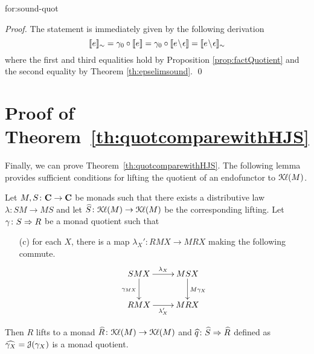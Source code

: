 \documentclass[oribibl,envcountsame,envcountsect,runningheads]{llncs}
\newcommand{\Kl}{\mathcal{K}{\kern-.2ex}\ell}
\newcommand{\lift}[1]{\smash{\widehat{#1}}}
\newcommand{\J}{\mathcal{J}}
\renewcommand{\>}{\rangle}
\newcommand{\bb}[1]{[\![ #1 ]\!]}
\def\epselim#1{{#1}\!\setminus\! \epsilon}
\newcommand{\bbq}[1]{\bb{#1}_{\sim}}
\def\To{\Rightarrow}
\newenvironment{corollary_for}[2][\empty]{\bigskip\noindent{\bf
    Corollary~\ref{#2}}\ifthenelse{\equal{#1}{\empty}}{{\bf.}}{ {\bf (#1).}}\it}{\vspace{0.5cm}}
\begin{document}
\begin{corollary_for} {for:sound-quot}
\corSoundQuot
\end{corollary_for}
\begin{proof} The statement is immediately given by the following derivation
\[\bbq{e} = \quotG_0 \circ \bb{e} = \quotG_0 \circ \bb{\epselim e} = \bbq{\epselim e}\]
where the first and third equalities hold by Proposition \ref{prop:factQuotient} and the second equality by Theorem \ref{th:epselimsound}. \qed
\end{proof}





\section{Proof of Theorem~\ref{th:quotcomparewithHJS}}
Finally, we can prove Theorem~\ref{th:quotcomparewithHJS}. The following lemma provides sufficient conditions for lifting the quotient of an endofunctor to $\Kl(M)$.
\begin{proposition}\label{lemma:quotient}
Let $M,S\colon \mathbf{C} \to \mathbf{C}$ be monads such that there exists a distributive law $\lambda\colon SM \to MS$ and
 let $\lift{S}\colon \Kl(M) \to \Kl(M)$ be the corresponding lifting.
 Let $\quotG \colon S \To R$ be a monad quotient  such that
\begin{itemize}
\item[(c)] for each $X$, there is a map
 $\lambda_X'\colon RMX \to MRX$ making the following commute.
 $$\xymatrix{
 SMX \ar[d]_{\quotG_{MX}} \ar[r]^{\lambda_X} & MSX \ar[d]^{M{\quotG}_X}\\
 RMX \ar[r]_{\lambda'_X} & MRX
 }$$
 \end{itemize}
 Then $R$ lifts to a monad
 $\lift{R}\colon \Kl(M) \to \Kl(M)$ and $\lift{q} \colon \lift{S} \To \lift{R}$ defined as $\lift{\quotG_X}=\J(\quotG_X)$ is a monad quotient.
\end{proposition}
\end{document}
